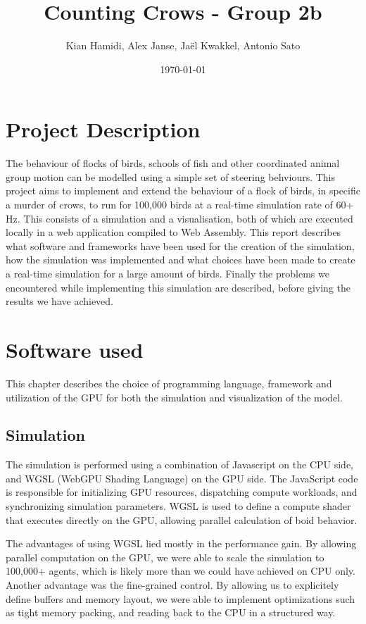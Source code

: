 \documentclass[a4paper, 12pt]{article}
\title{Counting Crows - Group 2b}
\author{ Kian Hamidi, Alex Janse, Jaël Kwakkel, Antonio Sato }
\date{ \today }
\begin{document}
\maketitle

\tableofcontents

\section{Project Description}\label{sec:proj_desc}
The behaviour of flocks of birds, schools of fish and other coordinated animal
group motion can be modelled using a simple set of steering behviours. This
project aims to implement and extend the behaviour of a flock of birds, in
specific a murder of crows, to run for 100,000 birds at a real-time simulation
rate of 60+ Hz. This consists of a simulation and a visualisation, both of
which are executed locally in a web application compiled to Web Assembly. This
report describes what software and frameworks have been used for the creation
of the simulation, how the simulation was implemented and what choices have
been made to create a real-time simulation for a large amount of birds. Finally
the problems we encountered while implementing this simulation are described,
before giving the results we have achieved.

\section{Software used}\label{sec:software}
This chapter describes the choice of programming language, framework and
utilization of the GPU for both the simulation and visualization of the model.

\subsection{Simulation}\label{subsec:simulation}
The simulation is performed using a combination of Javascript on the CPU side,
and WGSL (WebGPU Shading Language) on the GPU side. The JavaScript code is
responsible for initializing GPU resources, dispatching compute workloads, and
synchronizing simulation parameters. WGSL is used to define a compute shader
that executes directly on the GPU, allowing parallel calculation of boid
behavior.

The advantages of using WGSL lied mostly in the performance gain. By allowing
parallel computation on the GPU, we were able to scale the simulation to
100,000+ agents, which is likely more than we could have achieved on CPU only.
Another advantage was the fine-grained control. By allowing us to explicitely
define buffers and memory layout, we were able to implement optimizations such
as tight memory packing, and reading back to the CPU in a structured way.
\end{document}
